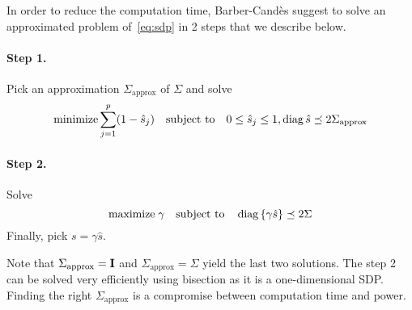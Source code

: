 In order to reduce the computation time,
Barber-Candès suggest to solve an approximated problem of~\ref{eq:sdp} in 2 steps that we describe below.
\paragraph*{Step 1.}
Pick an approximation $\Sigma_\text{approx}$ of $\Sigma$ and solve
\[
    \text{minimize} \sum_{j = 1}^p (1 - \hat{s}_j)
    \quad\text{subject to}\quad
    0 \leq \hat{s}_j \leq 1, \operatorname*{diag}{\hat{s}} \preceq 2\Sigma_\text{approx}
\]
\paragraph*{Step 2.}
Solve
\[
    \text{maximize}\;\gamma
    \quad\text{subject to}\quad
    \operatorname*{diag}\left\{\gamma\hat{s}\right\} \preceq 2\Sigma
\]
Finally, pick $s = \gamma \hat{s}$.

Note that $\Sigma_\text{approx} = \mathbf{I}$ and $\Sigma_\text{approx} = \Sigma$ yield
the last two solutions.
The step 2 can be solved very efficiently using bisection as it is a one-dimensional SDP\@.
Finding the right  $\Sigma_\text{approx}$ is a compromise between computation time and power.
